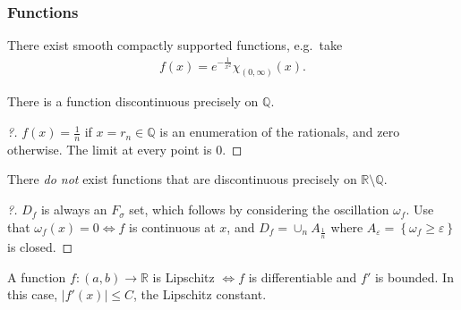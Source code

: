 \hypertarget{functions}{%
\subsubsection{Functions}\label{functions}}

\begin{proposition}

There exist smooth compactly supported functions, e.g.~take
\begin{align*}
f(x) = e^{-\frac{1}{x^2}} \chi_{(0, \infty)}(x)
.\end{align*}

\end{proposition}

\begin{lemma}

There is a function discontinuous precisely on \({\mathbb{Q}}\).

\end{lemma}

\begin{proof}[?]

\(f(x) = \frac 1 n\) if \(x = r_n \in {\mathbb{Q}}\) is an enumeration
of the rationals, and zero otherwise. The limit at every point is 0.

\end{proof}

\begin{proposition}

There \emph{do not} exist functions that are discontinuous precisely on
\({\mathbb{R}}\setminus {\mathbb{Q}}\).

\end{proposition}

\begin{proof}[?]

\(D_f\) is always an \(F_\sigma\) set, which follows by considering the
oscillation \(\omega_f\). Use that \(\omega_f(x) = 0 \iff f\) is
continuous at \(x\), and \(D_f = \cup_n A_{\frac 1 n}\) where
\(A_\varepsilon = \left\{{\omega_f \geq \varepsilon}\right\}\) is
closed.

\end{proof}

\begin{proposition}

A function \(f: (a, b) \to {\mathbb{R}}\) is Lipschitz \(\iff f\) is
differentiable and \(f'\) is bounded. In this case,
\({\left\lvert {f'(x)} \right\rvert} \leq C\), the Lipschitz constant.

\end{proposition}

